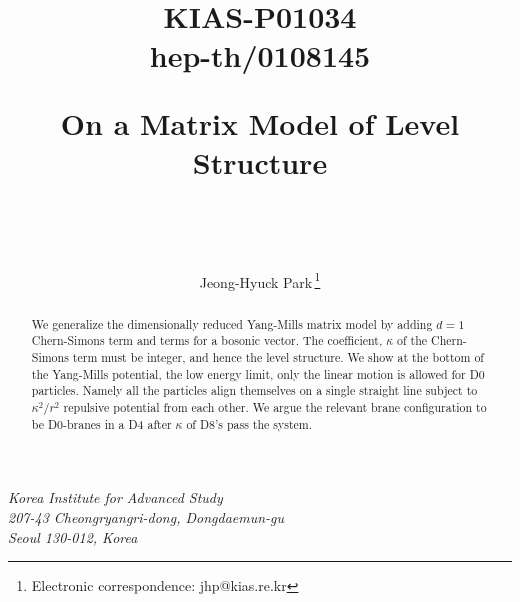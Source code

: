 \documentclass[a4paper,12pt]{article}
\begin{document}
\begin{titlepage}
\title{\vskip -60pt
{\small
\begin{flushright}
KIAS-P01034\\ hep-th/0108145
\end{flushright}}
\vskip 45pt  On  a Matrix Model of Level Structure} \vspace{4.0cm}
\author{\\
\\
\\Jeong-Hyuck Park\,\thanks{Electronic correspondence: jhp@kias.re.kr}}
\date{}
\maketitle
\vspace{-1.0cm}
\begin{center}
\textit{Korea Institute for Advanced Study}\\ \textit{207-43 Cheongryangri-dong, Dongdaemun-gu}\\ \textit{Seoul
130-012, Korea}
\end{center}
\vspace{2.0cm}
\begin{abstract}
\noindent  We generalize the   dimensionally reduced Yang-Mills matrix model by  adding  $d=1$ Chern-Simons term
and  terms for a bosonic vector. The coefficient, $\kappa$ of the Chern-Simons term must be integer, and hence the
level structure.  We show at the bottom of the Yang-Mills potential, the low energy limit,  only the linear motion
is allowed for D0 particles. Namely  all the particles align themselves on a single straight line subject to
$\kappa^{2}/r^2$ repulsive potential from each other. We argue the relevant brane configuration to be  D0-branes
in a D4 after $\kappa$ of D8's  pass the system.
\end{abstract}

\thispagestyle{empty}
\end{titlepage}
\newpage


\end{document}
